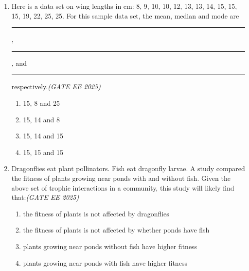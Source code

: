 \begin{enumerate}[leftmargin=*,label=\textbf{Q.\arabic*},resume]

\item Here is a data set on wing lengths in cm: 8, 9, 10, 10, 12, 13, 13, 14, 15, 15, 15, 19, 22, 25, 25. For this sample data set, the mean, median and mode are \rule{3cm}{0.15mm}, \rule{3cm}{0.15mm}, and \rule{3cm}{0.15mm} respectively.\hfill \textit{(GATE EE 2025)}
\begin{multicols}{2}
\begin{enumerate}[label=(\Alph*)]
\item 15, 8 and 25
\item 15, 14 and 8
\item 15, 14 and 15
\item 15, 15 and 15
\end{enumerate}
\end{multicols}

\item Dragonflies eat plant pollinators. Fish eat dragonfly larvae. A study compared the fitness of plants growing near ponds with and without fish. Given the above set of trophic interactions in a community, this study will likely find that:\hfill \textit{(GATE EE 2025)}
\begin{multicols}{2}
\begin{enumerate}[label=(\Alph*)]
\item the fitness of plants is not affected by dragonflies
\item the fitness of plants is not affected by whether ponds have fish
\item plants growing near ponds without fish have higher fitness
\item plants growing near ponds with fish have higher fitness
\end{enumerate}
\end{multicols}


\end{enumerate}
